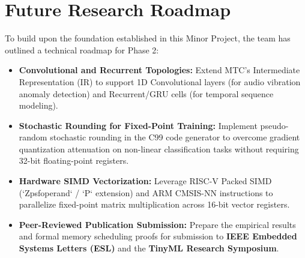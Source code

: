 \documentclass[12pt,a4paper]{report}
\begin{document}
\section{Future Research Roadmap}
To build upon the foundation established in this Minor Project, the team has outlined a technical roadmap for Phase 2:
\begin{itemize}
    \item \textbf{Convolutional and Recurrent Topologies:} Extend MTC's Intermediate Representation (IR) to support 1D Convolutional layers (for audio vibration anomaly detection) and Recurrent/GRU cells (for temporal sequence modeling).
    \item \textbf{Stochastic Rounding for Fixed-Point Training:} Implement pseudo-random stochastic rounding in the C99 code generator to overcome gradient quantization attenuation on non-linear classification tasks without requiring 32-bit floating-point registers.
    \item \textbf{Hardware SIMD Vectorization:} Leverage RISC-V Packed SIMD (`Zpsfoperand` / `P` extension) and ARM CMSIS-NN instructions to parallelize fixed-point matrix multiplication across 16-bit vector registers.
    \item \textbf{Peer-Reviewed Publication Submission:} Prepare the empirical results and formal memory scheduling proofs for submission to \textbf{IEEE Embedded Systems Letters (ESL)} and the \textbf{TinyML Research Symposium}.
\end{itemize}
\end{document}
